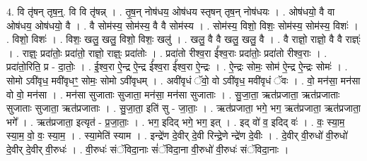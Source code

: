 \documentclass[17pt]{extarticle}
\begin{document}
4. वि तृ॑षन् तृष॒न्॒. वि वि तृ॑षन्न् । . तृ॒ष॒न् नोष॑धय॒ ओष॑धय स्तृषन् तृष॒न् नोष॑धयः । . ओष॑धयो॒ वै वा ओष॑धय॒ ओष॑धयो॒ वै । . वै सोम॑स्य॒ सोम॑स्य॒ वै वै सोम॑स्य । . सोम॑स्य॒ विशो॒ विशः॒ सोम॑स्य॒ सोम॑स्य॒ विशः॑ । . विशो॒ विशः॑ । . विशः॒ खलु॒ खलु॒ विशो॒ विशः॒ खलु॑ । . खलु॒ वै वै खलु॒ खलु॒ वै । . वै राज्ञो॒ राज्ञो॒ वै वै राज्ञ्ः॑ । . राज्ञ्ः॒ प्रदा॑तोः॒ प्रदा॑तो॒ राज्ञो॒ राज्ञ्ः॒ प्रदा॑तोः । . प्रदा॑तो रीश्व॒रा ई᳚श्व॒राः प्रदा॑तोः॒ प्रदा॑तो रीश्व॒राः । . प्रदा॑तो॒रिति॒ प्र - दा॒तोः॒ । . ई॒श्व॒रा ऐ॒न्द्र ऐ॒न्द्र ई᳚श्व॒रा ई᳚श्व॒रा ऐ॒न्द्रः । . ऐ॒न्द्रः सोमः॒ सोम॑ ऐ॒न्द्र ऐ॒न्द्रः सोमः॑ । . सोमो ऽवी॑वृध॒ मवी॑वृधꣳ॒॒ सोमः॒ सोमो ऽवी॑वृधम् । . अवी॑वृधं ॅवो॒ वो ऽवी॑वृध॒ मवी॑वृधं ॅवः । . वो॒ मन॑सा॒ मन॑सा वो वो॒ मन॑सा । . मन॑सा सुजाताः सुजाता॒ मन॑सा॒ मन॑सा सुजाताः । . सु॒जा॒ता॒ ऋत॑प्रजाता॒ ऋत॑प्रजाताः सुजाताः सुजाता॒ ऋत॑प्रजाताः । . सु॒जा॒ता॒ इति॑ सु - जा॒ताः॒ । . ऋत॑प्रजाता॒ भगे॒ भग॒ ऋत॑प्रजाता॒ ऋत॑प्रजाता॒ भगे᳚ । . ऋत॑प्रजाता॒ इत्यृत॑ - प्र॒जा॒ताः॒ । . भग॒ इदिद् भगे॒ भग॒ इत् । . इद् वो॑ व॒ इदिद् वः॑ । . वः॒ स्या॒म॒ स्या॒म॒ वो॒ वः॒ स्या॒म॒ । . स्या॒मेति॑ स्याम । . इन्द्रे॑ण दे॒वीर् दे॒वी रिन्द्रे॒णे न्द्रे॑ण दे॒वीः । . दे॒वीर् वी॒रुधो॑ वी॒रुधो॑ दे॒वीर् दे॒वीर् वी॒रुधः॑ । . वी॒रुधः॑ संॅविदा॒नाः सं॑ॅविदा॒ना वी॒रुधो॑ वी॒रुधः॑ संॅविदा॒नाः । \newline
\end{document}
